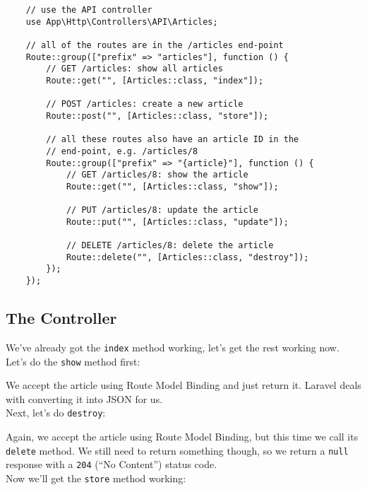 \begin{verbatim}
    // use the API controller
    use App\Http\Controllers\API\Articles;

    // all of the routes are in the /articles end-point
    Route::group(["prefix" => "articles"], function () {
        // GET /articles: show all articles
        Route::get("", [Articles::class, "index"]);

        // POST /articles: create a new article
        Route::post("", [Articles::class, "store"]);

        // all these routes also have an article ID in the
        // end-point, e.g. /articles/8
        Route::group(["prefix" => "{article}"], function () {
            // GET /articles/8: show the article
            Route::get("", [Articles::class, "show"]);

            // PUT /articles/8: update the article
            Route::put("", [Articles::class, "update"]);

            // DELETE /articles/8: delete the article
            Route::delete("", [Articles::class, "destroy"]);
        });
    });
\end{verbatim}

\subsection{The Controller}

We've already got the \texttt{index} method working, let's get the rest working now.
\\

Let's do the \texttt{show} method first:


We accept the article using Route Model Binding and just return it. Laravel deals with converting it into JSON for us.
\\

Next, let's do \texttt{destroy}:


Again, we accept the article using Route Model Binding, but this time we call its \texttt{delete} method. We still need to return something though, so we return a \texttt{null} response with a \texttt{204} (``No Content'') status code.
\\

Now we'll get the \texttt{store} method working:


